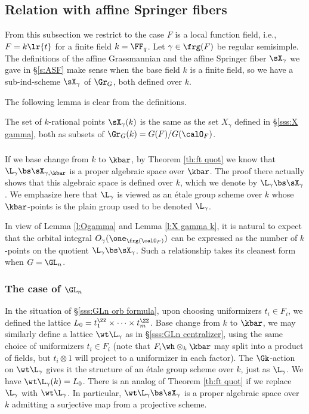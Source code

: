 \subsection{Relation with affine Springer fibers}\label{ss:orb ASF}
From this subsection we restrict to the case $F$ is a local function field, i.e., $F=k\lr{t}$ for a finite field $k=\FF_{q}$. Let $\gamma\in\frg(F)$ be regular semisimple. The definitions of the affine Grassmannian and the affine Springer fiber $\sX_{\gamma}$ we gave in \S\ref{s:ASF} make sense when the base field $k$ is a finite field, so we have a sub-ind-scheme $\sX_{\gamma}$ of $\Gr_{G}$, both defined over $k$. 

The following lemma is clear from the definitions.
\begin{lemma}\label{l:X gamma k} The set of $k$-rational points $\sX_{\gamma}(k)$ is the same as the set $X_{\gamma}$ defined in \S\ref{sss:X gamma}, both as subsets of $\Gr_{G}(k)=G(F)/G(\calO_{F})$.
\end{lemma}

\subsubsection{} If we base change from $k$ to $\kbar$,  by Theorem \ref{th:ft quot} we know that $\L_{\gamma}\bs \sX_{\gamma,\kbar}$ is a proper algebraic space over $\kbar$. The proof there actually shows that this algebraic space is defined over $k$, which we denote by $\L_{\gamma}\bs \sX_{\gamma}$. We emphasize here that $\L_{\gamma}$ is viewed as an \'etale group scheme over $k$ whose $\kbar$-points is the plain group used to be denoted $\L_{\gamma}$.

In view of Lemma \ref{l:Ogamma} and Lemma \ref{l:X gamma k}, it is natural to expect that the orbital integral $O_{\gamma}(\one_{\frg(\calO_{F})})$ can be expressed as the number of $k$-points on the quotient $\L_{\gamma}\bs \sX_{\gamma}$. Such a relationship takes its cleanest form when $G=\GL_{n}$. 


\subsubsection{The case of $\GL_{n}$}\label{sss:GLn orb coho}
In the situation of \S\ref{sss:GLn orb formula}, upon choosing uniformizers $t_{i}\in F_{i}$, we defined the lattice $L_{0}=t^{\ZZ}_{1}\times \cdots\times t^{\ZZ}_{m}$. Base change from $k$ to $\kbar$, we may similarly define a lattice $\wt\L_{\gamma}$ as in \S\ref{sss:GLn centralizer}, using the same choice of uniformizers $t_{i}\in F_{i}$ (note that $F_{i}\wh\otimes_{k}\kbar$ may split into a product of fields, but $t_{i}\otimes 1$ will project to a uniformizer in each factor). The $\Gk$-action on $\wt\L_{\gamma}$ gives it the structure of an \'etale group scheme over $k$, just as $\L_{\gamma}$. We have $\wt\L_{\gamma}(k)=L_{0}$. There is an analog of Theorem \ref{th:ft quot} if we replace $\L_{\gamma}$ with $\wt\L_{\gamma}$. In particular, $\wt\L_{\gamma}\bs\sX_{\gamma}$ is a proper algebraic space over $k$ admitting a surjective map from a projective scheme.


